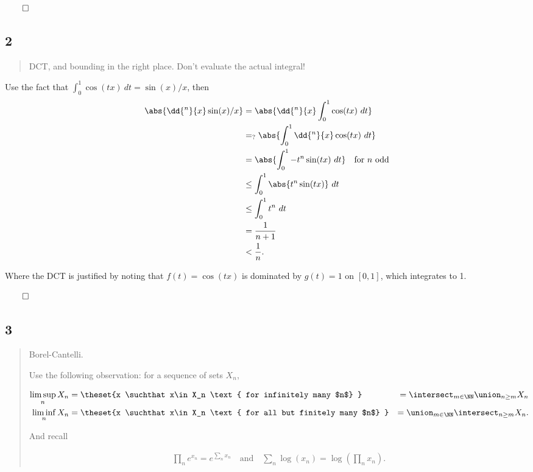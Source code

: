 \(\qed\)

\hypertarget{section-1}{%
\subsection{2}\label{section-1}}

\begin{quote}
DCT, and bounding in the right place. Don't evaluate the actual
integral!
\end{quote}

Use the fact that \(\int_0^1 \cos(tx) ~dt = \sin(x)/x\), then
\begin{align*}
\abs {\dd{^n}{x} \sin(x)/x  }
&= \abs { \dd{^n}{x}\int_0^1 \cos(tx)~dt }\\
&=_? \abs{ \int_0^1  \dd{^n}{x} \cos(tx)~dt }\\
&= \abs{ \int_0^1 -t^n \sin(tx) ~dt } \quad \text{for $n$ odd}\\
&\leq \int_0^1 \abs{t^n \sin(tx)} ~dt \\
&\leq \int_0^1 t^n ~dt \\ 
&= \frac{1}{n+1} \\
&< \frac{1}{n}
.\end{align*}

Where the DCT is justified by noting that \(f(t) = \cos(tx)\) is
dominated by \(g(t) = 1\) on \([0, 1]\), which integrates to 1.

\(\qed\)

\hypertarget{section-2}{%
\subsection{3}\label{section-2}}

\begin{quote}
Borel-Cantelli.

Use the following observation: for a sequence of sets \(X_n\),

\begin{align*}
\limsup_n X_n &= \theset{x \suchthat x\in X_n \text{ for infinitely many $n$} } 
&= \intersect_{m\in \NN} \union_{n\geq m} X_n
\\
\liminf_n X_n &= \theset{x \suchthat x\in X_n \text{ for all but finitely many $n$} }
&= \union_{m\in \NN} \intersect_{n\geq m} X_n
.\end{align*}

And recall

\begin{align*}
\prod_n e^{x_n} = e^{\sum_n x_n} \quad\text{and} \quad \sum_n \log(x_n) = \log\left(\prod_n x_n\right)
.\end{align*}
\end{quote}

